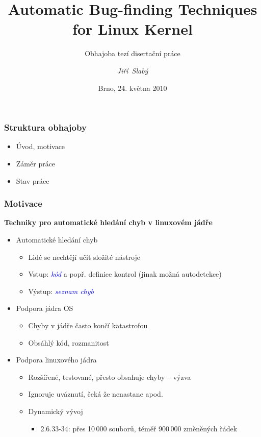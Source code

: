 \documentclass[xcolor=dvipsnames]{beamer}
\title[Automatic Kernel Bug-finding]
{Automatic Bug-finding Techniques for Linux Kernel}
\subtitle
{Obhajoba tezí disertační práce}
\author[J. Slabý]{\emph{Jiří~Slabý}}
\institute[FI, MU] %
{Fakulta Informatiky, Masarykova Univerzita}
\date[24. 5. 2010, Brno]{Brno, 24. května 2010}
\let\Oldemph\emph
\renewcommand{\emph}[1]{\textcolor{blue}{\Oldemph{#1}}}
\newcommand{\heading}[1]{\textbf{\textcolor{BurntOrange}{#1}}}
\begin{document}
\begin{frame}
  \titlepage
\end{frame}


\begin{frame}
  \frametitle{Struktura obhajoby}
  \begin{itemize}
  \item Úvod, motivace
  \medskip
  \item Záměr práce
  \medskip
  \item Stav práce
  \end{itemize}
\end{frame}

\begin{frame}
  \frametitle{Motivace}
  \begin{center}
  \heading{Techniky pro automatické hledání chyb v linuxovém jádře}
  \end{center}

  \pause
  \smallskip

  \begin{itemize}
  \item Automatické hledání chyb
  \begin{itemize}
  \item Lidé se nechtějí učit složité nástroje
  \item Vstup: \emph{kód} a popř. definice kontrol (jinak možná autodetekce)
  \item Výstup: \emph{seznam chyb}
  \end{itemize}\pause
  \item Podpora jádra OS
  \begin{itemize}
  \item Chyby v jádře často končí katastrofou
  \item Obsáhlý kód, rozmanitost
  \end{itemize}\pause
  \item Podpora linuxového jádra
  \begin{itemize}
  \item Rozšířené, testované, přesto obsahuje chyby -- výzva
  \item Ignoruje uváznutí, čeká že nenastane apod.
  \item Dynamický vývoj
    \begin{itemize}
    \item 2.6.33-34: přes 10\,000 souborů, téměř 900\,000 změněných řádek
    \end{itemize}
  \end{itemize}
  \end{itemize}

\end{frame}
\end{document}
